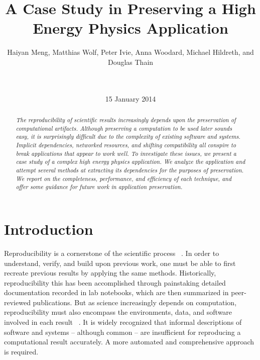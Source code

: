 \documentclass{sig-alternate}
\begin{document}
\title{A Case Study in Preserving a High Energy Physics Application}
\author{
Haiyan Meng, Matthias Wolf, Peter Ivie, Anna Woodard, Michael Hildreth, and Douglas Thain\\
\\
\\
}
\date{15 January 2014}
\maketitle

\begin{abstract}
\it The reproducibility of scientific results increasingly
depends upon the preservation of computational artifacts.
Although preserving a computation to be used later sounds
easy, it is surprisingly difficult due to the complexity
of existing software and systems.  Implicit dependencies,
networked resources, and shifting compatibility all conspire
to break applications that appear to work well.  To investigate
these issues, we present a case study of a complex high energy
physics application.  We analyze the application and attempt
several methods at extracting its dependencies for the purposes
of preservation.  We report on the completeness, performance,
and efficiency of each technique, and offer some guidance for
future work in application preservation.
\end{abstract}



\section{Introduction}

Reproducibility is a cornerstone of the scientific process ~\cite{borgman2012data}.
In order to understand, verify, and build upon previous work,
one must be able to first recreate previous results by applying
the same methods. Historically, reproducibility this has been
accomplished through painstaking detailed documentation recorded
in lab notebooks, which are then summarized in peer-reviewed publications.
But as science increasingly depends on computation,
reproducibility must also encompass the environments, data, and software
involved in each result ~\cite{zabolitzky2002preserving}. It is widely recognized that informal
descriptions of software and systems -- although common -- are insufficient
for reproducing a computational result accurately.
A more automated and comprehensive approach is required.
\end{document}
